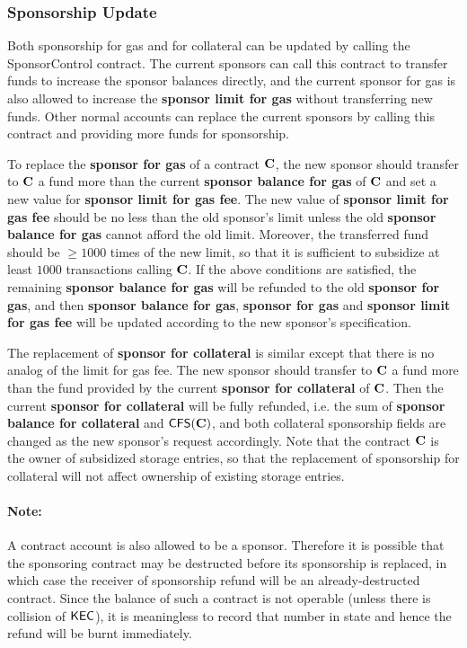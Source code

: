 \subsubsection{Sponsorship Update}

Both sponsorship for gas and for collateral can be updated by calling the SponsorControl contract.
The current sponsors can call this contract to transfer funds to increase the sponsor balances directly,
and the current sponsor for gas is also allowed to increase the \textbf{sponsor limit for gas} without transferring new funds.
Other normal accounts can replace the current sponsors by calling this contract and providing more funds for sponsorship.



To replace the \textbf{sponsor for gas} of a contract $\mathbf{C}$, the new sponsor should transfer to $\mathbf{C}$ a fund more than the current \textbf{sponsor balance for gas} of $\mathbf{C}$ and set a new value for \textbf{sponsor limit for gas fee}.
The new value of \textbf{sponsor limit for gas fee} should be no less than the old sponsor's limit  
unless the old \textbf{sponsor balance for gas} cannot afford the old limit.
Moreover, the transferred fund should be $\ge 1000$ times of the new limit, so that it is sufficient to subsidize at least $1000$  transactions calling $\mathbf{C}$. 
If the above conditions are satisfied, the remaining \textbf{sponsor balance for gas} will be refunded to the old \textbf{sponsor for gas},
and then \textbf{sponsor balance for gas}, \textbf{sponsor for gas} and \textbf{sponsor limit for gas fee} will be updated according to the new sponsor's specification.


The replacement of \textbf{sponsor for collateral} is similar except that there is no analog of the limit for gas fee.
The new sponsor should transfer to $\mathbf{C}$ a fund more than the fund provided by the current \textbf{sponsor for collateral} of $\mathbf{C}$.
Then the current \textbf{sponsor for collateral} will be fully refunded, i.e. the sum of \textbf{sponsor balance for collateral} and $\mathsf{CFS}(\mathbf{C})$,
and both collateral sponsorship fields are changed as the new sponsor's request accordingly.
Note that the contract $\mathbf{C}$ is the owner of subsidized storage entries, so that the replacement of sponsorship for collateral will not affect ownership of existing storage entries.

\paragraph{Note:} A contract account is also allowed to be a sponsor.
Therefore it is possible that the sponsoring contract may be destructed before its sponsorship is replaced,
in which case the receiver of sponsorship refund will be an already-destructed contract.
Since the balance of such a contract is not operable (unless there is collision of $\mathsf{KEC}$),
it is meaningless to record that number in state and hence the refund will be burnt immediately.

